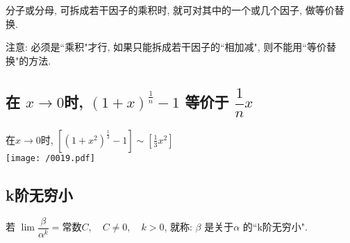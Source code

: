 \documentclass[UTF8]{ctexart}
\begin{document}
分子或分母, 可拆成若干因子的乘积时, 就可对其中的一个或几个因子, 做等价替换.

注意: 必须是``乘积"才行, 如果只能拆成若干因子的``相加减", 则不能用``等价替换"的方法.




\subsection{ 在 $x \to 0 $时,  $ (1+x)^{\frac{1} {n}} - 1 $ 等价于 $ \dfrac{1} {n} x $ } 


\begin{myEnvSample}
 在$x \to 0 $时, 	$	\left[ \left( 1+x^2 \right) ^{\frac{1}{3}}-1 \right] \sim \left[ \frac{1}{3}x^2 \right] 	$ \\

	\texttt{[image: /0019.pdf]}
\end{myEnvSample}




\subsection{k阶无穷小 } 

若 $\lim \dfrac{\beta} {\alpha^k} =  \text{常数}C, \quad C \ne 0,\quad  k>0 $, 就称: $\beta$ 是关于$\alpha$ 的``k阶无穷小".
\end{document}
